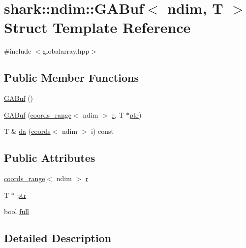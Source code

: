 \hypertarget{classshark_1_1ndim_1_1_g_a_buf}{}\section{shark\+:\+:ndim\+:\+:G\+A\+Buf$<$ ndim, T $>$ Struct Template Reference}
\label{classshark_1_1ndim_1_1_g_a_buf}


{\ttfamily \#include $<$globalarray.\+hpp$>$}

\subsection*{Public Member Functions}
\begin{DoxyCompactItemize}
\item 
\hyperlink{classshark_1_1ndim_1_1_g_a_buf_a66e3b3963eabbac578716e5d1e971f6b}{G\+A\+Buf} ()
\item 
\hyperlink{classshark_1_1ndim_1_1_g_a_buf_a9cddb291657305e457de784f5bfe6510}{G\+A\+Buf} (\hyperlink{structshark_1_1ndim_1_1coords__range}{coords\+\_\+range}$<$ ndim $>$ \hyperlink{classshark_1_1ndim_1_1_g_a_buf_ad956cb661d537077c40362c8bc371ddf}{r}, T $\ast$\hyperlink{classshark_1_1ndim_1_1_g_a_buf_a97b125250ee5edfc8c9f5c3663928421}{ptr})
\item 
T \& \hyperlink{classshark_1_1ndim_1_1_g_a_buf_a748bf80c4d30d646c8368db7a7c57acf}{da} (\hyperlink{structshark_1_1ndim_1_1coords}{coords}$<$ ndim $>$ i) const
\end{DoxyCompactItemize}
\subsection*{Public Attributes}
\begin{DoxyCompactItemize}
\item 
\hyperlink{structshark_1_1ndim_1_1coords__range}{coords\+\_\+range}$<$ ndim $>$ \hyperlink{classshark_1_1ndim_1_1_g_a_buf_ad956cb661d537077c40362c8bc371ddf}{r}
\item 
T $\ast$ \hyperlink{classshark_1_1ndim_1_1_g_a_buf_a97b125250ee5edfc8c9f5c3663928421}{ptr}
\item 
bool \hyperlink{classshark_1_1ndim_1_1_g_a_buf_ac5dd94b05ab78e812b0831dbb2651584}{full}
\end{DoxyCompactItemize}


\subsection{Detailed Description}
